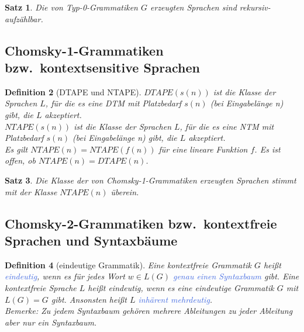 \documentclass[11pt]{scrartcl}
\newcommand{\tcol}[1]{\textcolor{RoyalBlue}{#1}}
\theoremstyle{break}
\newtheorem{satz}{Satz}[section]
\newtheorem{defi}[satz]{Definition}
\begin{document}
    \begin{satz}
        Die von Typ-0-Grammatiken $G$ erzeugten Sprachen sind rekursiv-aufzählbar.
    \end{satz}


    \subsection{Chomsky-1-Grammatiken bzw.\ kontextsensitive Sprachen}
	\label{subsec:chomsky-1-grammatiken-bzw.-kontextsensitive-sprachenindex}

    \begin{defi}[DTAPE und NTAPE]
        $DTAPE(s(n))$ ist die Klasse der Sprachen $L$, für die es eine DTM mit Platzbedarf $s(n)$ (bei Eingabelänge n) gibt, die $L$ akzeptiert.\\
        $NTAPE(s(n))$ ist die Klasse der Sprachen $L$, für die es eine NTM mit Platzbedarf $s(n)$ (bei Eingabelänge n) gibt, die $L$ akzeptiert.\\
        Es gilt $NTAPE(n)=NTAPE(f(n))$ für eine lineare Funktion $f$.
        Es ist offen, ob $NTAPE(n)=DTAPE(n)$.
    \end{defi}

    \begin{satz}
        Die Klasse der von Chomsky-1-Grammatiken erzeugten Sprachen stimmt mit der Klasse $NTAPE(n)$ überein.
    \end{satz}


    \subsection{Chomsky-2-Grammatiken bzw.\ kontextfreie Sprachen und Syntaxbäume}
	\label{subsec:chomsky-2-grammatiken-bzw.-kontextfreie-sprachenindexund-syntaxbäume}

    \begin{defi}[eindeutige Grammatik]
        Eine kontextfreie Grammatik $G$ heißt \tcol{eindeutig}, wenn es für jedes Wort $w\in L(G)$ \tcol{genau einen Syntaxbaum} gibt.
        Eine kontextfreie Sprache $L$ heißt eindeutig, wenn es eine eindeutige Grammatik $G$ mit $L(G)=G$ gibt.
        Ansonsten heißt $L$ \tcol{inhärent mehrdeutig}.\\
        Bemerke: Zu jedem Syntaxbaum gehören mehrere Ableitungen zu jeder Ableitung aber nur ein Syntaxbaum.
    \end{defi}
\end{document}
